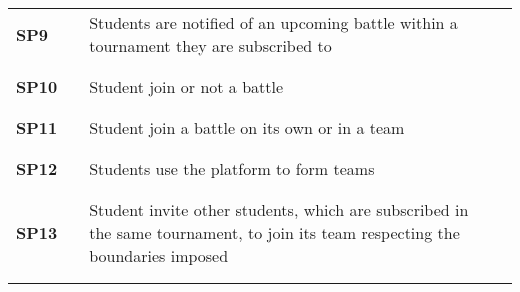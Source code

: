 \begin{longtable}[H]{l l p{8.5cm} l l}
     \textbf{SP9}              & \vline & Students are notified of an upcoming battle within a tournament they are subscribed to                                                & \vline &                        \\
                               &        &                                                                                                                                       &        &                        \\\hline & & & & \\
     \textbf{SP10}             & \vline & Student join or not a battle                                                                                                          & \vline &                        \\
                               &        &                                                                                                                                       &        &                        \\\hline & & & & \\
     \textbf{SP11}             & \vline & Student join a battle on its own or in a team                                                                                         & \vline &                        \\
                               &        &                                                                                                                                       &        &                        \\\hline & & & & \\
     \textbf{SP12}             & \vline & Students use the platform to form teams                                                                                               & \vline &                        \\
                               &        &                                                                                                                                       &        &                        \\\hline & & & & \\
     \textbf{SP13}             & \vline & Student invite other students, which are subscribed in the same tournament, to join its team respecting the boundaries imposed        & \vline &                        \\
                               &        &                                                                                                                                       &        &                        \\\hline & & & & \\

\end{longtable}
